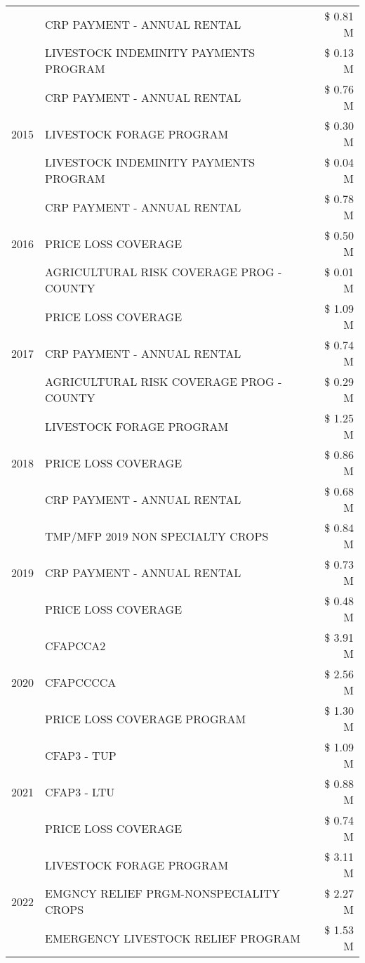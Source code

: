 \begin{tabular}{llr}
 & CRP PAYMENT - ANNUAL RENTAL & \$ 0.81 M \\
 & LIVESTOCK INDEMINITY PAYMENTS PROGRAM & \$ 0.13 M \\
\cline{1-3}
\multirow[t]{3}{*}{2015} & CRP PAYMENT - ANNUAL RENTAL & \$ 0.76 M \\
 & LIVESTOCK FORAGE PROGRAM & \$ 0.30 M \\
 & LIVESTOCK INDEMINITY PAYMENTS PROGRAM & \$ 0.04 M \\
\cline{1-3}
\multirow[t]{3}{*}{2016} & CRP PAYMENT - ANNUAL RENTAL & \$ 0.78 M \\
 & PRICE LOSS COVERAGE & \$ 0.50 M \\
 & AGRICULTURAL RISK COVERAGE PROG - COUNTY & \$ 0.01 M \\
\cline{1-3}
\multirow[t]{3}{*}{2017} & PRICE LOSS COVERAGE & \$ 1.09 M \\
 & CRP PAYMENT - ANNUAL RENTAL & \$ 0.74 M \\
 & AGRICULTURAL RISK COVERAGE PROG - COUNTY & \$ 0.29 M \\
\cline{1-3}
\multirow[t]{3}{*}{2018} & LIVESTOCK FORAGE PROGRAM & \$ 1.25 M \\
 & PRICE LOSS COVERAGE & \$ 0.86 M \\
 & CRP PAYMENT - ANNUAL RENTAL & \$ 0.68 M \\
\cline{1-3}
\multirow[t]{3}{*}{2019} & TMP/MFP 2019 NON SPECIALTY CROPS & \$ 0.84 M \\
 & CRP PAYMENT - ANNUAL RENTAL & \$ 0.73 M \\
 & PRICE LOSS COVERAGE & \$ 0.48 M \\
\cline{1-3}
\multirow[t]{3}{*}{2020} & CFAPCCA2 & \$ 3.91 M \\
 & CFAPCCCCA & \$ 2.56 M \\
 & PRICE LOSS COVERAGE PROGRAM & \$ 1.30 M \\
\cline{1-3}
\multirow[t]{3}{*}{2021} & CFAP3 - TUP & \$ 1.09 M \\
 & CFAP3 - LTU & \$ 0.88 M \\
 & PRICE LOSS COVERAGE & \$ 0.74 M \\
\cline{1-3}
\multirow[t]{3}{*}{2022} & LIVESTOCK FORAGE PROGRAM & \$ 3.11 M \\
 & EMGNCY RELIEF PRGM-NONSPECIALITY CROPS & \$ 2.27 M \\
 & EMERGENCY LIVESTOCK RELIEF PROGRAM & \$ 1.53 M \\
\cline{1-3}
\bottomrule
\end{tabular}
